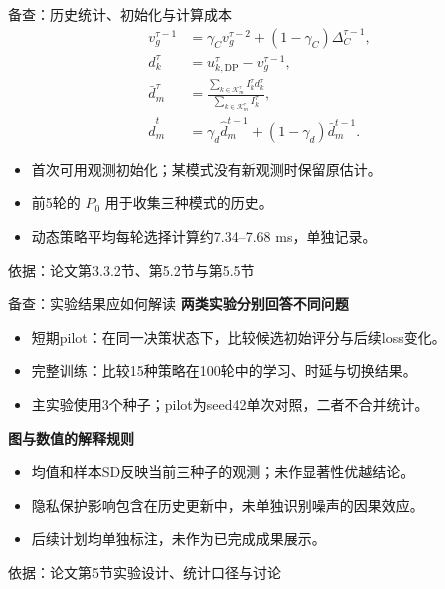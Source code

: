 \documentclass[aspectratio=169,11pt]{beamer}
\newcommand{\src}[1]{\vfill{\color{Gray}\fontsize{7.5}{9}\selectfont 依据：#1\par}}
\newcommand{\tight}{\setlength{\itemsep}{.18cm}}
\begin{document}
\begin{frame}{备查：历史统计、初始化与计算成本}
\begin{align*}
v_g^{\tau-1}
&=\gamma_Cv_g^{\tau-2}+(1-\gamma_C)\Delta_C^{\tau-1},\\
d_k^\tau&=u_{k,\mathrm{DP}}^\tau-v_g^{\tau-1},\\
\bar d_m^\tau
&=\frac{\sum_{k\in\mathcal K_m^\tau}I_k^\tau d_k^\tau}
{\sum_{k\in\mathcal K_m^\tau}I_k^\tau},\\
\widehat d_m^t
&=\gamma_d\widehat d_m^{t-1}+(1-\gamma_d)\bar d_m^{t-1}.
\end{align*}
\begin{itemize}\tight
\item 首次可用观测初始化；某模式没有新观测时保留原估计。
\item 前5轮的 $P_0$ 用于收集三种模式的历史。
\item 动态策略平均每轮选择计算约7.34--7.68 ms，单独记录。
\end{itemize}
\src{论文第3.3.2节、第5.2节与第5.5节}
\end{frame}

\begin{frame}{备查：实验结果应如何解读}
\textbf{两类实验分别回答不同问题}
\begin{itemize}\tight
\item 短期pilot：在同一决策状态下，比较候选初始评分与后续loss变化。
\item 完整训练：比较15种策略在100轮中的学习、时延与切换结果。
\item 主实验使用3个种子；pilot为seed42单次对照，二者不合并统计。
\end{itemize}
\par\vspace{.2cm}
\textbf{图与数值的解释规则}
\begin{itemize}\tight
\item 均值和样本SD反映当前三种子的观测；未作显著性优越结论。
\item 隐私保护影响包含在历史更新中，未单独识别噪声的因果效应。
\item 后续计划均单独标注，未作为已完成成果展示。
\end{itemize}
\src{论文第5节实验设计、统计口径与讨论}
\end{frame}
\end{document}
